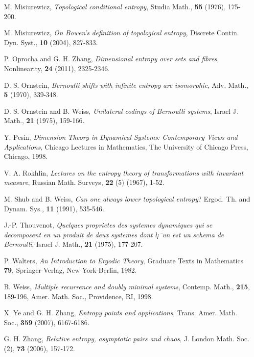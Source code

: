 \documentclass[12pt]{amsart}
\theoremstyle{definition} \theoremstyle{question}
\numberwithin{equation}{section}
\begin{document}
\begin{thebibliography}{99}
 M. Misiurewicz, \emph{Topological conditional entropy},
{Studia Math., \bf 55} (1976), 175-200.

 M. Misiurewicz, \emph{On Bowen's definition of topological entropy},
{Discrete Contin. Dyn. Syst., \bf 10} (2004), 827-833.

 P. Oprocha and G. H. Zhang, \emph{Dimensional entropy over sets and fibres}, {Nonlinearity, \bf 24} (2011), 2325-2346.

 D. S. Ornstein, {\it Bernoulli shifts with infinite entropy are isomorphic},
Adv. Math., {\bf 5} (1970), 339-348.

 D. S. Ornstein and B. Weiss, {\it Unilateral codings of Bernoulli
systems}, Israel J. Math., {\bf 21} (1975), 159-166.

 Y. Pesin, \emph{Dimension Theory in Dynamical Systems:
Contemporary Views and Applications}, Chicago Lectures in
Mathematics, The University of Chicago Press, Chicago, 1998.

 V. A. Rokhlin, {\it Lectures on the entropy theory of transformations
with invariant measure}, Russian Math. Surveys, {\bf 22} (5) (1967),
1-52.

 M. Shub and B. Weiss, \emph{Can one always lower
topological entropy}? {Ergod. Th. and Dynam. Sys., \bf 11} (1991),
535-546.

 J.-P. Thouvenot, {\it Quelques proprietes des systemes dynamiques
 qui se decomposent en un produit de
deux systemes dont l¡¯un est un schema de Bernoulli}, Israel J.
Math., {\bf 21} (1975), 177-207.

 P. Walters, \emph{An Introduction to Ergodic Theory},
{Graduate Texts in Mathematics \bf 79}, Springer-Verlag, New
York-Berlin, 1982.

 B. Weiss, {\it Multiple recurrence and doubly minimal systems}, Contemp. Math., {\bf 215},
189-196,  Amer. Math. Soc., Providence, RI, 1998.

 X. Ye and G. H. Zhang, \emph{Entropy
points and applications}, {Trans. Amer. Math. Soc.,} {\bf
359} (2007), 6167-6186.

 G. H. Zhang, \emph{Relative entropy, asymptotic pairs and
chaos}, {J. London Math. Soc. (2), \bf 73} (2006), 157-172.

\end{thebibliography}
\end{document}
